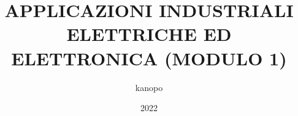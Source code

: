 \documentclass{article}
\begin{document}
    \author{kanopo}
    \title{APPLICAZIONI INDUSTRIALI ELETTRICHE ED ELETTRONICA (MODULO 1)}
    \date{2022}

    \maketitle
    \tableofcontents

    \listoffigures
    \listoftables

    
    
    



    
\end{document}
